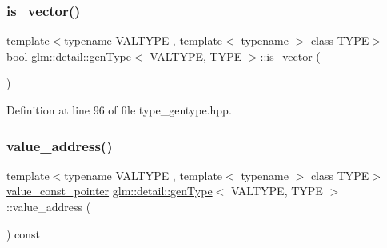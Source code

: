 \mbox{\label{structglm_1_1detail_1_1gen_type_ae83087df55201bdc46a37decf3d1c34c}} 
\subsubsection{\texorpdfstring{is\+\_\+vector()}{is\_vector()}}
{\footnotesize\ttfamily template$<$typename V\+A\+L\+T\+Y\+PE , template$<$ typename $>$ class T\+Y\+PE$>$ \\
bool \hyperlink{structglm_1_1detail_1_1gen_type}{glm\+::detail\+::gen\+Type}$<$ V\+A\+L\+T\+Y\+PE, T\+Y\+PE $>$\+::is\+\_\+vector (\begin{DoxyParamCaption}{ }\end{DoxyParamCaption})\hspace{0.3cm}{\ttfamily [static]}}



Definition at line 96 of file type\+\_\+gentype.\+hpp.

\mbox{\label{structglm_1_1detail_1_1gen_type_a5dcc128cfa6f3fdc478d7169ec3cb71b}} 
\subsubsection{\texorpdfstring{value\+\_\+address()}{value\_address()}\hspace{0.1cm}{\footnotesize\ttfamily [1/2]}}
{\footnotesize\ttfamily template$<$typename V\+A\+L\+T\+Y\+PE , template$<$ typename $>$ class T\+Y\+PE$>$ \\
\hyperlink{structglm_1_1detail_1_1gen_type_a34e169ae6d50e1c76574c850eae2c7fc}{value\+\_\+const\+\_\+pointer} \hyperlink{structglm_1_1detail_1_1gen_type}{glm\+::detail\+::gen\+Type}$<$ V\+A\+L\+T\+Y\+PE, T\+Y\+PE $>$\+::value\+\_\+address (\begin{DoxyParamCaption}{ }\end{DoxyParamCaption}) const\hspace{0.3cm}{\ttfamily [inline]}}



